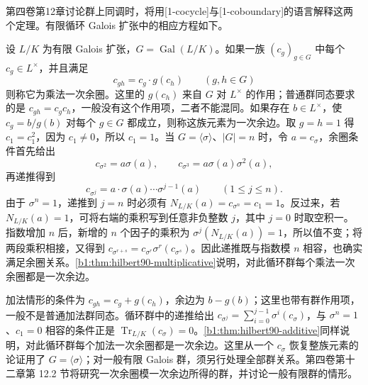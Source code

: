 第四卷第12章讨论群上同调时，将用[1-cocycle]与[1-coboundary]的语言解释这两个定理。有限循环 Galois 扩张中的相应方程如下。

\ProseParagraphBreak
设 \(L/K\) 为有限 Galois 扩张，\(G=\operatorname{Gal}(L/K)\)。如果一族 \((c_g)_{g\in G}\) 中每个 \(c_g\in L^\times\)，并且满足
\[
	c_{gh}=c_g\cdot g(c_h)\qquad(g,h\in G)
\]
则称它为乘法一次余圈。这里的 \(g(c_h)\) 来自 \(G\) 对 \(L^\times\) 的作用；普通群同态要求的是 \(c_{gh}=c_gc_h\)，一般没有这个作用项，二者不能混同。如果存在 \(b\in L^\times\)，使 \(c_g=b/g(b)\) 对每个 \(g\in G\) 都成立，则称这族元素为一次余边。取 \(g=h=1\) 得 \(c_1=c_1^2\)，因为 \(c_1\ne0\)，所以 \(c_1=1\)。当 \(G=\langle\sigma\rangle\)、\(|G|=n\) 时，令 \(a=c_\sigma\)，余圈条件首先给出
\[
	c_{\sigma^2}=a\sigma(a),\qquad c_{\sigma^3}=a\sigma(a)\sigma^2(a),
\]
再递推得到
\[
	c_{\sigma^j}=a\cdot\sigma(a)\cdots\sigma^{j-1}(a) \qquad(1\le j\le n).
\]
由于 \(\sigma^n=1\)，递推到 \(j=n\) 时必须有 \(N_{L/K}(a)=c_{\sigma^n}=c_1=1\)。反过来，若 \(N_{L/K}(a)=1\)，可将右端的乘积写到任意非负整数 \(j\)，其中 \(j=0\) 时取空积一。指数增加 \(n\) 后，新增的 \(n\) 个因子的乘积为 \(\sigma^j(N_{L/K}(a))=1\)，所以值不变；将两段乘积相接，又得到 \(c_{\sigma^{r+s}}=c_{\sigma^r}\sigma^r(c_{\sigma^s})\)。因此递推既与指数模 \(n\) 相容，也确实满足余圈关系。\cref{b1:thm:hilbert90-multiplicative}说明，对此循环群每个乘法一次余圈都是一次余边。

\ProseParagraphBreak
加法情形的条件为 \(c_{gh}=c_g+g(c_h)\)，余边为 \(b-g(b)\)；这里也带有群作用项，一般不是普通加法群同态。循环群中的递推给出 \(c_{\sigma^j}=\sum_{i=0}^{j-1}\sigma^i(c_\sigma)\)，与 \(\sigma^n=1\)、\(c_1=0\) 相容的条件正是 \(\operatorname{Tr}_{L/K}(c_\sigma)=0\)。\cref{b1:thm:hilbert90-additive}同样说明，对此循环群每个加法一次余圈都是一次余边。这里从一个 \(c_\sigma\) 恢复整族元素的论证用了 \(G=\langle\sigma\rangle\)；对一般有限 Galois 群，须另行处理全部群关系。第四卷第十二章第 12.2 节将研究一次余圈模一次余边所得的群，并讨论一般有限群的情形。
